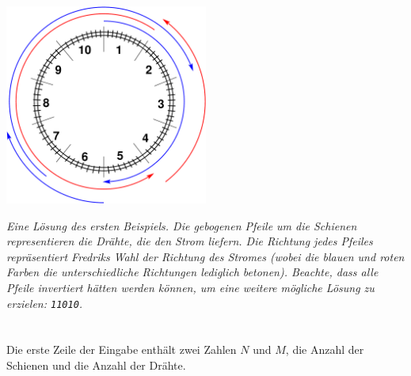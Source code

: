 

\vspace{2mm}
\begin{center}
\includegraphics[width=0.5\textwidth]{alternatingfig.pdf}
\end{center}
\vspace{1mm}

{\em Eine Lösung des ersten Beispiels. Die gebogenen Pfeile um die Schienen representieren die Drähte, die den Strom liefern. Die Richtung jedes Pfeiles repräsentiert Fredriks Wahl der Richtung des Stromes (wobei die blauen und roten Farben die unterschiedliche Richtungen lediglich betonen). Beachte, dass alle Pfeile invertiert hätten werden können, um eine weitere mögliche Lösung zu erzielen: \texttt{11010}.}


\section*{}
Die erste Zeile der Eingabe enthält zwei Zahlen $N$ und $M$, die Anzahl der Schienen und die Anzahl der Drähte.

